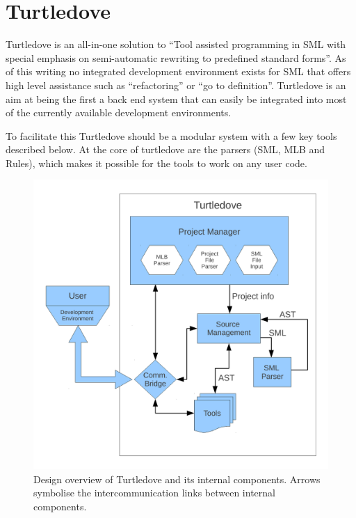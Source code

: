 \section{Turtledove}
\label{sec:design-turtledove}

Turtledove is an all-in-one solution to ``Tool assisted programming in SML with
special emphasis on semi-automatic rewriting to predefined standard forms''. As
of this writing no integrated development environment exists for SML that offers
high level assistance such as ``refactoring'' or ``go to definition''.
Turtledove is an aim at being the first a back end system that can easily be
integrated into most of the currently available development environments.

To facilitate this Turtledove should be a modular system with a few key tools
described below. At the core of turtledove are the parsers (SML, MLB and Rules),
which makes it possible for the tools to work on any user code.

\begin{figure}[h!]
  \centering
 \includegraphics[scale=0.4]{imgs/design/flow.pdf}
  \caption{Design overview of Turtledove and its internal components. Arrows
    symbolise the intercommunication links between internal components.}
  \label{fig:turtledove-design}
\end{figure}

